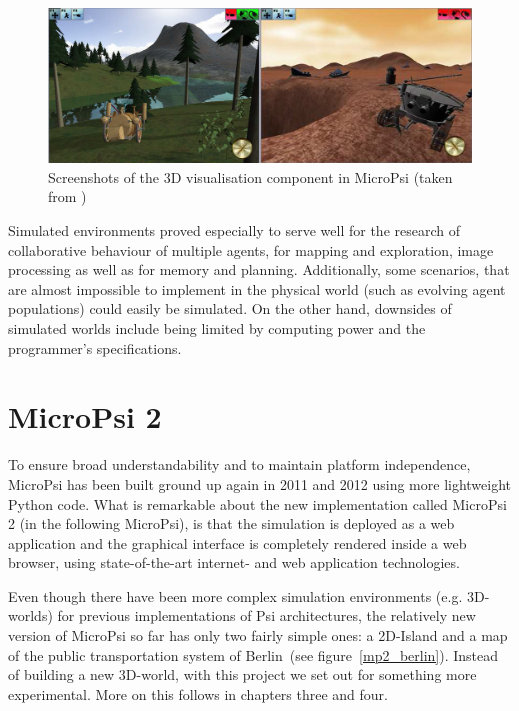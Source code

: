 \begin{figure}[h]
  \centering
    \includegraphics[width=14cm]{graphics/micropsi_3d_screen}
  \caption{Screenshots of the 3D visualisation component in MicroPsi (taken from \cite{Bach:2009:PSI:1611304})}
  \label{micropsi_3d_screen}
\end{figure}

Simulated environments proved especially to serve well for the research of collaborative behaviour of multiple agents, for mapping and exploration, image processing as well as for memory and planning. Additionally, some scenarios, that are almost impossible to implement in the physical world (such as evolving agent populations) could easily be simulated. On the other hand, downsides of simulated worlds include being limited by computing power and the programmer's specifications.~\cite{Bach:2009:PSI:1611304}

    \section{MicroPsi 2}
    \label{sec:2:MicroPsi}
To ensure broad understandability and to maintain platform independence, MicroPsi has been built ground up again in 2011 and 2012 using more lightweight Python code. What is remarkable about the new implementation called MicroPsi 2 (in the following MicroPsi), is that the simulation is deployed as a web application and the graphical interface is completely rendered inside a web browser, using state-of-the-art internet- and web application technologies.~\cite{conf/agi/Bach12}
        
Even though there have been more complex simulation environments (e.g. 3D-worlds) for previous implementations of Psi architectures, the relatively new version of MicroPsi so far has only two fairly simple ones: a 2D-Island and a map of the public transportation system of Berlin~(see figure~\ref{mp2_berlin}). Instead of building a new 3D-world, with this project we set out for something more experimental. More on this follows in chapters three and four.

